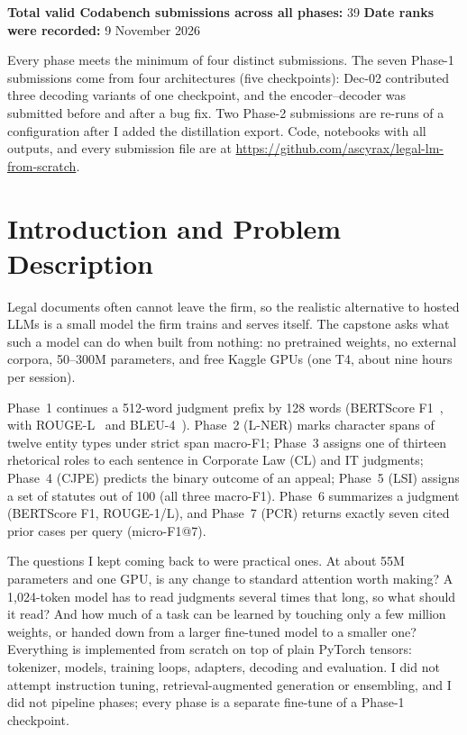 \documentclass[11pt, oneside]{article}
\begin{document}
\noindent
\textbf{Total valid Codabench submissions across all phases:} 39
\quad
\textbf{Date ranks were recorded:} 9 November 2026

\smallskip
\noindent Every phase meets the minimum of four distinct submissions. The seven Phase-1 submissions come from four architectures (five checkpoints): Dec-02 contributed three decoding variants of one checkpoint, and the encoder--decoder was submitted before and after a bug fix. Two Phase-2 submissions are re-runs of a configuration after I added the distillation export. Code, notebooks with all outputs, and every submission file are at \url{https://github.com/ascyrax/legal-lm-from-scratch}.

\section{Introduction and Problem Description}
Legal documents often cannot leave the firm, so the realistic alternative to hosted LLMs is a small model the firm trains and serves itself. The capstone asks what such a model can do when built from nothing: no pretrained weights, no external corpora, 50--300M parameters, and free Kaggle GPUs (one T4, about nine hours per session).

Phase~1 continues a 512-word judgment prefix by 128 words (BERTScore F1~\cite{zhang2020bertscore}, with ROUGE-L~\cite{lin2004rouge} and BLEU-4~\cite{papineni2002bleu}). Phase~2 (L-NER) marks character spans of twelve entity types under strict span macro-F1; Phase~3 assigns one of thirteen rhetorical roles to each sentence in Corporate Law (CL) and IT judgments; Phase~4 (CJPE) predicts the binary outcome of an appeal; Phase~5 (LSI) assigns a set of statutes out of 100 (all three macro-F1). Phase~6 summarizes a judgment (BERTScore F1, ROUGE-1/L), and Phase~7 (PCR) returns exactly seven cited prior cases per query (micro-F1@7).

The questions I kept coming back to were practical ones. At about 55M parameters and one GPU, is any change to standard attention worth making? A 1,024-token model has to read judgments several times that long, so what should it read? And how much of a task can be learned by touching only a few million weights, or handed down from a larger fine-tuned model to a smaller one? Everything is implemented from scratch on top of plain PyTorch tensors: tokenizer, models, training loops, adapters, decoding and evaluation. I did not attempt instruction tuning, retrieval-augmented generation or ensembling, and I did not pipeline phases; every phase is a separate fine-tune of a Phase-1 checkpoint.
\end{document}
